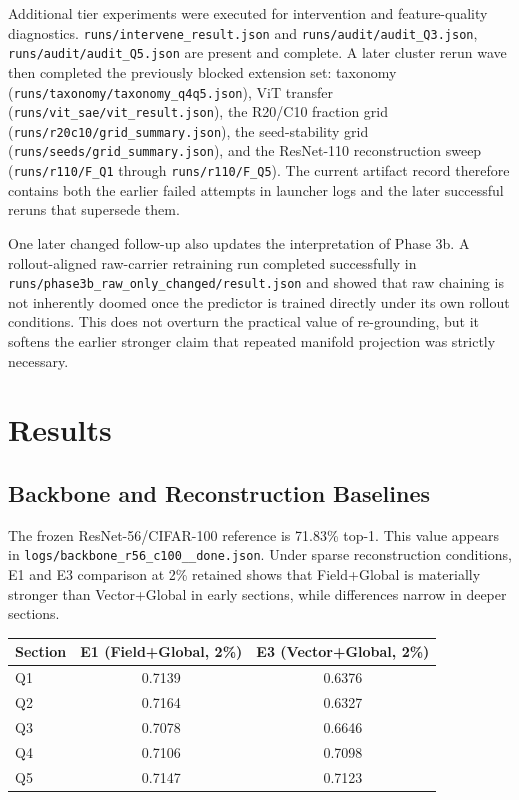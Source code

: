 \documentclass[11pt]{article}
\begin{document}
Additional tier experiments were executed for intervention and feature-quality diagnostics. \texttt{runs/intervene\_result.json} and \texttt{runs/audit/audit\_Q3.json}, \texttt{runs/audit/audit\_Q5.json} are present and complete. A later cluster rerun wave then completed the previously blocked extension set: taxonomy (\texttt{runs/taxonomy/taxonomy\_q4q5.json}), ViT transfer (\texttt{runs/vit\_sae/vit\_result.json}), the R20/C10 fraction grid (\texttt{runs/r20c10/grid\_summary.json}), the seed-stability grid (\texttt{runs/seeds/grid\_summary.json}), and the ResNet-110 reconstruction sweep (\texttt{runs/r110/F\_Q1} through \texttt{runs/r110/F\_Q5}). The current artifact record therefore contains both the earlier failed attempts in launcher logs and the later successful reruns that supersede them.

One later changed follow-up also updates the interpretation of Phase 3b. A rollout-aligned raw-carrier retraining run completed successfully in \texttt{runs/phase3b\_raw\_only\_changed/result.json} and showed that raw chaining is not inherently doomed once the predictor is trained directly under its own rollout conditions. This does not overturn the practical value of re-grounding, but it softens the earlier stronger claim that repeated manifold projection was strictly necessary.

\section{Results}
\subsection{Backbone and Reconstruction Baselines}
The frozen ResNet-56/CIFAR-100 reference is 71.83\% top-1. This value appears in \texttt{logs/backbone\_r56\_c100\_\_done.json}. Under sparse reconstruction conditions, E1 and E3 comparison at 2\% retained shows that Field+Global is materially stronger than Vector+Global in early sections, while differences narrow in deeper sections.

\begin{center}
\begin{tabular}{lcc}
\toprule
Section & E1 (Field+Global, 2\%) & E3 (Vector+Global, 2\%) \\
\midrule
Q1 & 0.7139 & 0.6376 \\
Q2 & 0.7164 & 0.6327 \\
Q3 & 0.7078 & 0.6646 \\
Q4 & 0.7106 & 0.7098 \\
Q5 & 0.7147 & 0.7123 \\
\bottomrule
\end{tabular}
\end{center}
\end{document}
